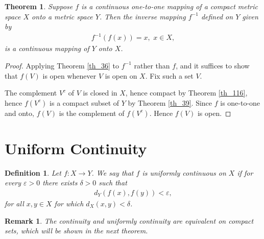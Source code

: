 \documentclass[10pt]{book}
\newtheorem{definition}{Definition}[chapter]
\newtheorem{theorem}{Theorem}[chapter]
\newtheorem{remark}{Remark}[chapter]
\theoremstyle{definition}
\numberwithin{equation}{chapter}
\begin{document}
\medskip

\begin{theorem}
Suppose $f$ is a continuous one-to-one mapping of a compact metric space $X$ onto a metric space $Y$. Then the inverse mapping $f^{-1}$ defined on $Y$ given by
\begin{align*}
    f^{-1}(f(x)) = x, \,\, x \in X,
\end{align*}
is a continuous mapping of $Y$ onto $X$.
\end{theorem}
\begin{proof}
Applying Theorem \ref{th_36} to $f^{-1}$ rather than $f$, and it suffices to show that $f(V)$ is open whenever $V$ is open on $X$. Fix such a set $V$.

The complement $V^c$ of $V$ is closed in $X$, hence compact by Theorem \ref{th_116}, hence $f(V^c)$ is a compact subset of $Y$ by Theorem \ref{th_39}. Since $f$ is one-to-one and onto, $f(V)$ is the complement of $f(V^c)$. Hence $f(V)$ is open.
\end{proof}

\medskip


\section{Uniform Continuity}

\begin{definition}
Let $f: X \to Y$. We say that $f$ is uniformly continuous on $X$ if for every $\varepsilon > 0$ there exists $\delta > 0$ such that 
\begin{align*}
    d_Y(f(x),f(y)) < \varepsilon,
\end{align*}
for all $x,y \in X$ for which $d_X(x,y) < \delta$.
\end{definition}

\begin{remark}
The continuity and uniformly continuity are equivalent on compact sets, which will be shown in the next theorem.
\end{remark}

\medskip
\end{document}
